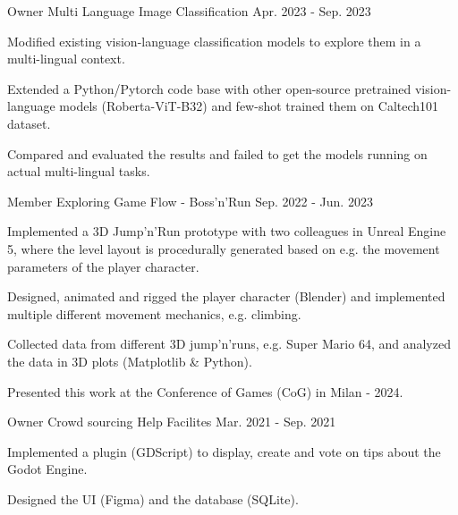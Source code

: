 \begin{cventries}
  \cventry
    {Owner} %
    {Multi Language Image Classification} %
    {\href{https://github.com/BrandnerKasper/MP_CustomCoOp}{\faGithubSquare}} %
    {Apr. 2023 - Sep. 2023} %
    {
      \begin{cvitems} %
        \item {Modified existing vision-language classification models to explore them in a multi-lingual context.}
        \item {Extended a Python/Pytorch code base with other open-source pretrained vision-language models (Roberta-ViT-B32) and few-shot trained them on Caltech101 dataset.}
        \item {Compared and evaluated the results and failed to get the models running on actual multi-lingual tasks.}
      \end{cvitems}
    }

  \cventry
    {Member} %
    {Exploring Game Flow - Boss'n'Run} %
    {\href{https://brandnerkasper.itch.io/bossn-run}{\faGamepad}} %
    {Sep. 2022 - Jun. 2023} %
    {
      \begin{cvitems} %
        \item {Implemented a 3D Jump'n'Run prototype with two colleagues in Unreal Engine 5, where the level layout is procedurally generated based on e.g. the movement parameters of the player character.}
        \item {Designed, animated and rigged the player character (Blender) and implemented multiple different movement mechanics, e.g. climbing.}
        \item {Collected data from different 3D jump'n'runs, e.g. Super Mario 64, and analyzed the data in 3D plots (Matplotlib \& Python).}%
        \item {Presented this work at the Conference of Games (CoG) in Milan - 2024.}
      \end{cvitems}
    }
    
  \cventry
    {Owner} %
    {Crowd sourcing Help Facilites} %
    {\href{https://github.com/BrandnerKasper/CrowdbasedHelpFacilites}{\faGithubSquare}} %
    {Mar. 2021 - Sep. 2021} %
    {
      \begin{cvitems} %
        \item {Implemented a plugin (GDScript) to display, create and vote on tips about the Godot Engine.}
        \item {Designed the UI (Figma) and the database (SQLite).}
      \end{cvitems}
    }


\end{cventries}
